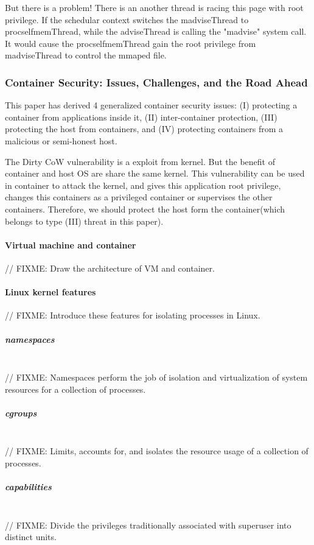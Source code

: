 \documentclass[12pt,a4paper]{IEEEconf}
\begin{document}
But there is a problem! There is an another thread is racing this page with root privilege.
If the schedular context switches the madviseThread to procselfmemThread, while the
adviseThread is calling the "madvise" system call. It would cause the procselfmemThread
gain the root privilege from madviseThread to control the mmaped file.

\subsubsection{Container Security: Issues, Challenges, and the Road Ahead}
This paper\cite{Road_Ahead} has derived 4 generalized container security issues:
(\RN{1}) protecting a container from applications inside it, (\RN{2}) inter-container
protection, (\RN{3}) protecting the host from containers, and (\RN{4}) protecting containers
from a malicious or semi-honest host.\cite{Road_Ahead}

The Dirty CoW vulnerability is a exploit from kernel. But the benefit
of container and host OS are share the same kernel. This vulnerability can be used in
container to attack the kernel, and gives this application root privilege, changes this
containers as a privileged container or supervises the other containers. Therefore, we should
protect the host form the container(which belongs to type (\RN{3}) threat in this paper).

\paragraph{Virtual machine and container}
// FIXME: Draw the architecture of VM and container.

\paragraph{Linux kernel features}
// FIXME: Introduce these features for isolating processes in Linux.

\subparagraph{namespaces}\mbox{}\\
// FIXME: Namespaces perform the job of isolation and virtualization of system resources
for a collection of processes.\cite{Road_Ahead}

\subparagraph{cgroups}\mbox{}\\
// FIXME: Limits, accounts for, and isolates the resource usage of a collection of processes.
\cite{cgroup_wiki}

\subparagraph{capabilities}\mbox{}\\
// FIXME: Divide the privileges traditionally associated with superuser into distinct
units.
\end{document}
